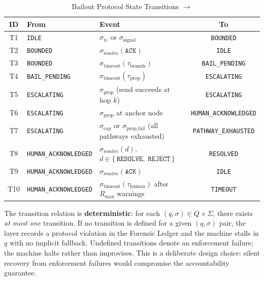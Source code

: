 \begin{table}[h]
\caption{Bailout Protocol State Transitions $\rightarrow$}
\label{tab:bp-transitions}
\small
\begin{tabular}{cllc}
\toprule
\textbf{ID} & \textbf{From} & \textbf{Event} & \textbf{To} \\
\midrule
T1 & \texttt{IDLE}                    & $\sigma_{\text{tc}}$ or $\sigma_{\text{signal}}$                      & \texttt{BOUNDED} \\
T2 & \texttt{BOUNDED}                 & $\sigma_{\text{resolve}}(\texttt{ACK})$                              & \texttt{IDLE} \\
T3 & \texttt{BOUNDED}                 & $\sigma_{\text{timeout}}(\tau_{\text{bounds}})$                      & \texttt{BAIL\_PENDING} \\
T4 & \texttt{BAIL\_PENDING}           & $\sigma_{\text{timeout}}(\tau_{\text{prop}})$                        & \texttt{ESCALATING} \\
T5 & \texttt{ESCALATING}              & $\sigma_{\text{prop}}$ (send succeeds at hop $k$)                   & \texttt{ESCALATING} \\
T6 & \texttt{ESCALATING}             & $\sigma_{\text{prop}}$ at anchor node                               & \texttt{HUMAN\_ACKNOWLEDGED} \\
T7 & \texttt{ESCALATING}             & $\sigma_{\text{cap}}$ or $\sigma_{\text{prop\_fail}}$ (all pathways exhausted) & \texttt{PATHWAY\_EXHAUSTED} \\
T8 & \texttt{HUMAN\_ACKNOWLEDGED}    & $\sigma_{\text{resolve}}(d)$, $d \in \{\,\texttt{RESOLVE},\; \texttt{REJECT}\,\}$ & \texttt{RESOLVED} \\
T9 & \texttt{HUMAN\_ACKNOWLEDGED}    & $\sigma_{\text{resolve}}(\texttt{ACK})$                             & \texttt{IDLE} \\
T10 & \texttt{HUMAN\_ACKNOWLEDGED}   & $\sigma_{\text{timeout}}(\tau_{\text{human}})$ after $R_{\max}$ warnings & \texttt{TIMEOUT} \\
\bottomrule
\end{tabular}
\end{table}

The transition relation is \textbf{deterministic}: for each $(q, \sigma) \in Q \times \Sigma$, there exists \textit{at most one} transition. If no transition is defined for a given $(q, \sigma)$ pair, the \fact{} layer records a protocol violation in the Forensic Ledger and the machine stalls in $q$ with no implicit fallback. Undefined transitions denote an enforcement failure; the machine halts rather than improvises. This is a deliberate design choice: silent recovery from enforcement failures would compromise the accountability guarantee.

